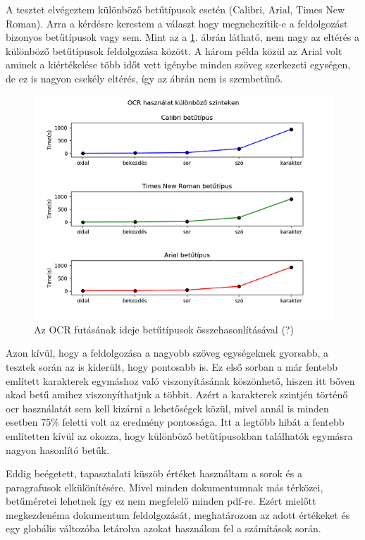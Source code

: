 A tesztet elvégeztem különböző betűtípusok esetén (Calibri, Arial, Times New Roman). Arra a kérdésre kerestem a választ hogy megnehezítik-e a feldolgozást bizonyos betűtípusok vagy sem. Mint az a \ref{fig:test font}. ábrán látható, nem nagy az eltérés a különböző betűtípusok feldolgozása között. A három példa közül az Arial volt aminek a kiértékelése több időt vett igénybe minden szöveg szerkezeti egységen, de ez is nagyon csekély eltérés, így az ábrán nem is szembetűnő.

\begin{figure}[H]
\centering
\includegraphics[scale=1]{images/test_ocr_font_types.png}
\caption{Az OCR futásának ideje betűtípusok összehasonlításával (?)}
\label{fig:test font}
\end{figure}

Azon kívül, hogy a feldolgozása a nagyobb szöveg egységeknek gyorsabb, a tesztek során az is kiderült, hogy pontosabb is. Ez első sorban a már fentebb említett karakterek egymáshoz való viszonyításának köszönhető, hiszen itt bőven akad betű amihez viszonyíthatjuk a többit. Azért a karakterek szintjén történő ocr használatát sem kell kizárni a lehetőségek közül, mivel annál is minden esetben 75\% feletti volt az eredmény pontossága. Itt a legtöbb hibát a fentebb említetten kívül az okozza, hogy különböző betűtípusokban találhatók egymásra nagyon hasonlító betűk.


Eddig beégetett, tapasztalati küszöb értéket használtam a sorok és a paragrafusok elkülönítésére. Mivel minden dokumentumnak más térközei, betűméretei lehetnek így ez nem megfelelő minden pdf-re. Ezért mielőtt megkezdenéma  dokumentum feldolgozását, meghatározom az adott értékeket és egy globális változóba letárolva azokat használom fel a számítások során.

